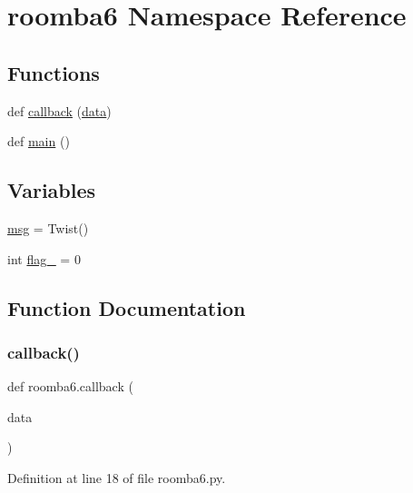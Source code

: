 \hypertarget{namespaceroomba6}{}\section{roomba6 Namespace Reference}
\label{namespaceroomba6}
\subsection*{Functions}
\begin{DoxyCompactItemize}
\item 
def \mbox{\hyperlink{namespaceroomba6_a05708101c29f33ae8ac6ba70930bf6bc}{callback}} (\mbox{\hyperlink{structdata}{data}})
\item 
def \mbox{\hyperlink{namespaceroomba6_a5dd83734933a9d31bd410d16c5be8b71}{main}} ()
\end{DoxyCompactItemize}
\subsection*{Variables}
\begin{DoxyCompactItemize}
\item 
\mbox{\hyperlink{namespaceroomba6_a8340124b9a25dc0fce1d54fc7d3d1cbc}{msg}} = Twist()
\item 
int \mbox{\hyperlink{namespaceroomba6_a7d6bc24ebce5b46903c9028729ed90ff}{flag\+\_}} = 0
\end{DoxyCompactItemize}


\subsection{Function Documentation}
\mbox{\label{namespaceroomba6_a05708101c29f33ae8ac6ba70930bf6bc}} 
\subsubsection{\texorpdfstring{callback()}{callback()}}
{\footnotesize\ttfamily def roomba6.\+callback (\begin{DoxyParamCaption}\item[{}]{data }\end{DoxyParamCaption})}



Definition at line 18 of file roomba6.\+py.

\mbox{\label{namespaceroomba6_a5dd83734933a9d31bd410d16c5be8b71}} 

